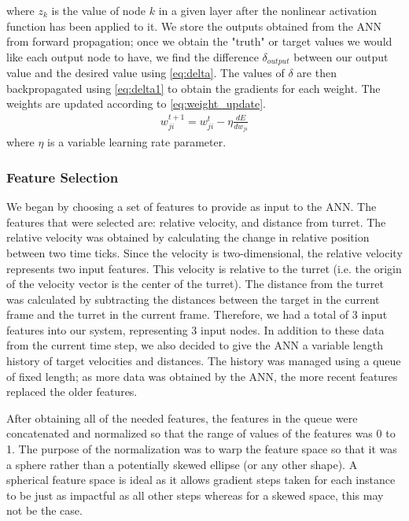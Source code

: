 \documentclass[11pt,letterpaper]{article}
\begin{document}
where $z_k$ is the value of node $k$ in a given layer after the nonlinear activation function has been applied to it. We store the outputs obtained from the ANN from forward propagation; once we obtain the "truth" or target values we would like each output node to have, we find the difference $\delta_{output}$ between our output value and the desired value using \eqref{eq:delta}. The values of $\delta$ are then backpropagated using \eqref{eq:delta1} to obtain the gradients for each weight. The weights are updated according to \eqref{eq:weight_update}.
\begin{align} 
\label{eq:weight_update}
w_{ji}^{t+1} = w_{ji}^{t} - \eta\frac{dE}{dw_{ji}}
\end{align}
where $\eta$ is a variable learning rate parameter.


\subsubsection{Feature Selection}
We began by choosing a set of features to provide as input to the ANN. The features that were selected are: relative velocity, and distance from turret. The relative velocity was obtained by calculating the change in relative position between two time ticks. Since the velocity is two-dimensional, the relative velocity represents two input features. This velocity is relative to the turret (i.e. the origin of the velocity vector is the center of the turret). The distance from the turret was calculated by subtracting the distances between the target in the current frame and the turret in the current frame. Therefore, we had a total of 3 input features into our system, representing 3 input nodes. In addition to these data from the current time step, we also decided to give the ANN a variable length history of target velocities and distances. The history was managed using a queue of fixed length; as more data was obtained by the ANN, the more recent features replaced the older features.

After obtaining all of the needed features, the features in the queue were concatenated and normalized so that the range of values of the features was 0 to 1. The purpose of the normalization was to warp the feature space so that it was a sphere rather than a potentially skewed ellipse (or any other shape). A spherical feature space is ideal as it allows gradient steps taken for each instance to be just as impactful as all other steps whereas for a skewed space, this may not be the case.
\end{document}
